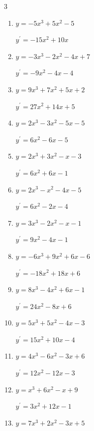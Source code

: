 \begin{multicols}{3}
\begin{enumerate}
        $\displaystyle y^{\prime}=-3x^{2}-3$

  \item $y=-5x^{3}+5x^{2}-5$

        $\displaystyle y^{\prime}=-15x^{2}+10x$

  \item $y=-3x^{3}-2x^{2}-4x+7$

        $\displaystyle y^{\prime}=-9x^{2}-4x-4$

  \item $y=9x^{3}+7x^{2}+5x+2$

        $\displaystyle y^{\prime}=27x^{2}+14x+5$

\columnbreak %

  \item $y=2x^{3}-3x^{2}-5x-5$

        $\displaystyle y^{\prime}=6x^{2}-6x-5$

  \item $y=2x^{3}+3x^{2}-x-3$

        $\displaystyle y^{\prime}=6x^{2}+6x-1$

  \item $y=2x^{3}-x^{2}-4x-5$

        $\displaystyle y^{\prime}=6x^{2}-2x-4$

  \item $y=3x^{3}-2x^{2}-x-1$

        $\displaystyle y^{\prime}=9x^{2}-4x-1$

  \item $y=-6x^{3}+9x^{2}+6x-6$

        $\displaystyle y^{\prime}=-18x^{2}+18x+6$

  \item $y=8x^{3}-4x^{2}+6x-1$

        $\displaystyle y^{\prime}=24x^{2}-8x+6$

  \item $y=5x^{3}+5x^{2}-4x-3$

        $\displaystyle y^{\prime}=15x^{2}+10x-4$

  \item $y=4x^{3}-6x^{2}-3x+6$

        $\displaystyle y^{\prime}=12x^{2}-12x-3$

  \item $y=x^{3}+6x^{2}-x+9$

        $\displaystyle y^{\prime}=3x^{2}+12x-1$

  \item $y=7x^{3}+2x^{2}-3x+5$


\end{enumerate}
\end{multicols}
